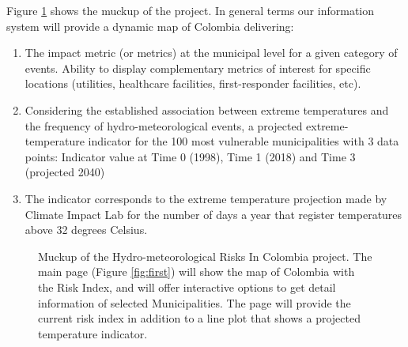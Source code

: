 Figure \ref{fig:muckup} shows the muckup of the project. In general terms our information system will provide a dynamic map of Colombia delivering:
\begin{enumerate}
\item The impact metric (or metrics) at the municipal level for a given category of events. Ability to display complementary metrics of interest for specific locations (utilities, healthcare facilities, first-responder facilities, etc).
\item Considering the established association between extreme temperatures and the frequency of hydro-meteorological events, a projected extreme-temperature indicator for the 100 most vulnerable municipalities with 3 data points: Indicator value at Time 0 (1998), Time 1 (2018) and Time 3 (projected 2040)
\item The indicator corresponds to the extreme temperature projection made by Climate Impact Lab for the number of days a year that register temperatures above 32 degrees Celsius.
\end{enumerate}

\begin{figure}%
\centering
{}%
\qquad
{}%
%
\caption{Muckup of the Hydro-meteorological Risks In Colombia project. The main page (Figure \ref{fig:first}) will show the map of Colombia with the Risk Index, and will offer interactive options to get detail information of selected Municipalities. The page will provide the current risk index in addition to a line plot that shows a projected temperature indicator.}
\label{fig:muckup}%
\end{figure}





